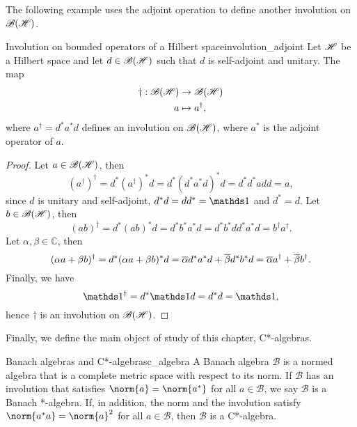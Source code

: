 The following example uses the adjoint operation to define another involution on \(\mathscr{B}(\mathscr{H})\).
\begin{example}{Involution on bounded operators of a Hilbert space}{involution_adjoint}
    Let \(\mathscr{H}\) be a Hilbert space and let \(d \in \mathscr{B}(\mathscr{H})\) such that \(d\) is self-adjoint and unitary. The map
    \begin{align*}
        \dag : \mathscr{B}(\mathscr{H}) &\to \mathscr{B}(\mathscr{H})\\
                                a &\mapsto a^\dag,
    \end{align*}
    where \(a^\dag = d^* a^* d\) defines an involution on \(\mathscr{B}(\mathscr{H})\), where \(a^*\) is the adjoint operator of \(a\).
\end{example}
\begin{proof}
    Let \(a \in \mathscr{B}(\mathscr{H})\), then
    \begin{equation*}
        (a^\dag)^\dag = d^* (a^\dag)^* d = d^* (d^* a^* d)^* d = d^* d^* a d d = a,
    \end{equation*}
    since \(d\) is unitary and self-adjoint, \(d^* d = d d^* = \unity\) and \(d^* = d\). Let \(b \in \mathscr{B}(\mathscr{H})\), then
    \begin{equation*}
        (ab)^\dag = d^*(ab)^* d = d^* b^* a^* d = d^* b^* d d^* a^* d = b^\dag a^\dag.
    \end{equation*}
    Let \(\alpha, \beta \in \mathbb{C}\), then
    \begin{equation*}
        (\alpha a + \beta b)^\dag = d^* (\alpha a + \beta b)^* d = \overline{\alpha} d^* a^* d + \overline{\beta} d^* b^* d = \overline{\alpha} a^\dag + \overline{\beta} b^\dag.
    \end{equation*}
    Finally, we have
    \begin{equation*}
        \unity^\dag = d^* \unity d = d^* d = \unity,
    \end{equation*}
    hence \(\dag\) is an involution on \(\mathscr{B}(\mathscr{H})\).
\end{proof}

Finally, we define the main object of study of this chapter, C*-algebras.
\begin{definition}{Banach algebras and C*-algebras}{c_algebra}
    A Banach algebra \(\mathscr{B}\) is a normed algebra that is a complete metric space with respect to its norm. If \(\mathscr{B}\) has an involution that satisfies \(\norm{a} = \norm{a^*}\) for all \(a \in \mathscr{B}\), we say \(\mathscr{B}\) is a Banach *-algebra. If, in addition, the norm and the involution satisfy \(\norm{a^*a} = \norm{a}^2\) for all \(a \in \mathscr{B}\), then \(\mathscr{B}\) is a C*-algebra.
\end{definition}

